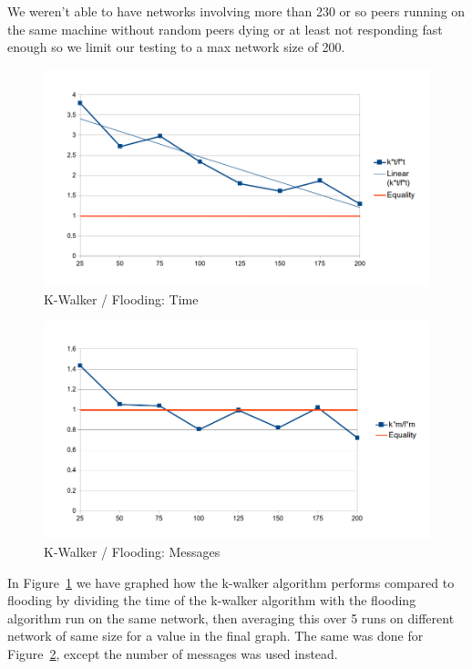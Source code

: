We weren't able to have networks involving more than 230 or so peers running on the same machine without random peers dying or at least not responding fast enough so we limit our testing to a max network size of 200.

\begin{figure}
\caption{K-Walker / Flooding: Time}
\label{graph_fvsk_t}
\includegraphics[width=\textwidth]{../Grapes/flooding_vs_kwalker_time_graph.png}
\end{figure}

\begin{figure}
\caption{K-Walker / Flooding: Messages}
\label{graph_fvsk_m}
\includegraphics[width=\textwidth]{../Grapes/flooding_vs_kwalker_messages_graph.png}
\end{figure}

In Figure~\ref{graph_fvsk_t} we have graphed how the k-walker algorithm performs compared to flooding by dividing the time of the k-walker algorithm with the flooding algorithm run on the same network, then averaging this over 5 runs on different network of same size for a value in the final graph. The same was done for Figure~\ref{graph_fvsk_m}, except the number of messages was used instead.

